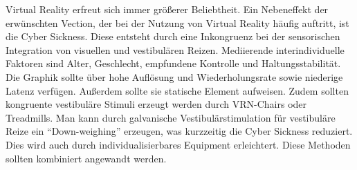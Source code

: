 Virtual Reality erfreut sich immer gr\"o{\ss}erer Beliebtheit. Ein  Nebeneffekt der erw\"unschten Vection, der bei der Nutzung von Virtual Reality h\"aufig auftritt, ist die Cyber Sickness.
Diese entsteht durch eine Inkongruenz bei der sensorischen Integration von visuellen und vestibul\"aren Reizen.
Mediierende interindividuelle Faktoren sind Alter, Geschlecht, empfundene Kontrolle und Haltungsstabilit\"at.
Die Graphik sollte \"uber hohe Aufl\"osung und Wiederholungsrate sowie niederige Latenz verf\"ugen. Au{\ss}erdem sollte sie statische Element aufweisen. Zudem sollten kongruente vestibul\"are Stimuli erzeugt werden durch VRN-Chairs oder Treadmills. Man kann durch galvanische Vestibul\"arstimulation f\"ur vestibul\"are Reize ein "`Down-weighing"' erzeugen, was kurzzeitig die Cyber Sickness reduziert. Dies wird auch durch individualisierbares Equipment erleichtert. Diese Methoden sollten kombiniert angewandt werden.
